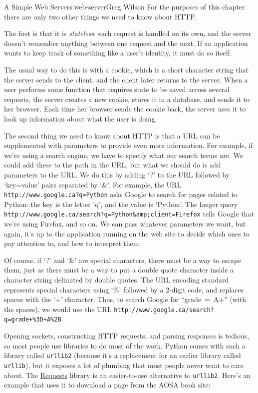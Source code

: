 \begin{aosachapter}{A Simple Web Server}{s:web-server}{Greg Wilson}
For the purposes of this chapter there are only two other things we need
to know about HTTP.

The first is that it is \emph{stateless}: each request is handled on its
own, and the server doesn't remember anything between one request and
the next. If an application wants to keep track of something like a
user's identity, it must do so itself.

The usual way to do this is with a cookie, which is a short character
string that the server sends to the client, and the client later returns
to the server. When a user performs some function that requires state to
be saved across several requests, the server creates a new cookie,
stores it in a database, and sends it to her browser. Each time her
browser sends the cookie back, the server uses it to look up information
about what the user is doing.

The second thing we need to know about HTTP is that a URL can be
supplemented with parameters to provide even more information. For
example, if we're using a search engine, we have to specify what our
search terms are. We could add these to the path in the URL, but what we
should do is add parameters to the URL. We do this by adding `?' to the
URL followed by `key=value' pairs separated by `\&'. For example, the
URL \texttt{http://www.google.ca?q=Python} asks Google to search for
pages related to Python: the key is the letter `q', and the value is
`Python'. The longer query
\texttt{http://www.google.ca/search?q=Python\&amp;client=Firefox} tells
Google that we're using Firefox, and so on. We can pass whatever
parameters we want, but again, it's up to the application running on the
web site to decide which ones to pay attention to, and how to interpret
them.

Of course, if `?' and `\&' are special characters, there must be a way
to escape them, just as there must be a way to put a double quote
character inside a character string delimited by double quotes. The URL
encoding standard represents special characters using `\%' followed by a
2-digit code, and replaces spaces with the `+' character. Thus, to
search Google for ``grade~=~A+'' (with the spaces), we would use the URL
\texttt{http://www.google.ca/search?q=grade+\%3D+A\%2B}.

Opening sockets, constructing HTTP requests, and parsing responses is
tedious, so most people use libraries to do most of the work. Python
comes with such a library called \texttt{urllib2} (because it's a
replacement for an earlier library called \texttt{urllib}), but it
exposes a lot of plumbing that most people never want to care about. The
\href{https://pypi.python.org/pypi/requests}{Requests} library is an
easier-to-use alternative to \texttt{urllib2}. Here's an example that
uses it to download a page from the AOSA book site:


\end{aosachapter}
